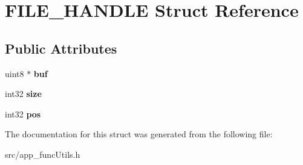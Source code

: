 \hypertarget{struct_f_i_l_e___h_a_n_d_l_e}{}\section{F\+I\+L\+E\+\_\+\+H\+A\+N\+D\+L\+E Struct Reference}
\label{struct_f_i_l_e___h_a_n_d_l_e}
\subsection*{Public Attributes}
\begin{DoxyCompactItemize}
\item 
\hypertarget{struct_f_i_l_e___h_a_n_d_l_e_a07404ae370473c61431b57ce10613802}{}uint8 $\ast$ {\bfseries buf}\label{struct_f_i_l_e___h_a_n_d_l_e_a07404ae370473c61431b57ce10613802}

\item 
\hypertarget{struct_f_i_l_e___h_a_n_d_l_e_a6b2c765e73789603e594c265eca4a9fa}{}int32 {\bfseries size}\label{struct_f_i_l_e___h_a_n_d_l_e_a6b2c765e73789603e594c265eca4a9fa}

\item 
\hypertarget{struct_f_i_l_e___h_a_n_d_l_e_ab84a110159894db3219e9d4fe4bc5c86}{}int32 {\bfseries pos}\label{struct_f_i_l_e___h_a_n_d_l_e_ab84a110159894db3219e9d4fe4bc5c86}

\end{DoxyCompactItemize}


The documentation for this struct was generated from the following file\+:\begin{DoxyCompactItemize}
\item 
src/app\+\_\+func\+Utils.\+h\end{DoxyCompactItemize}
